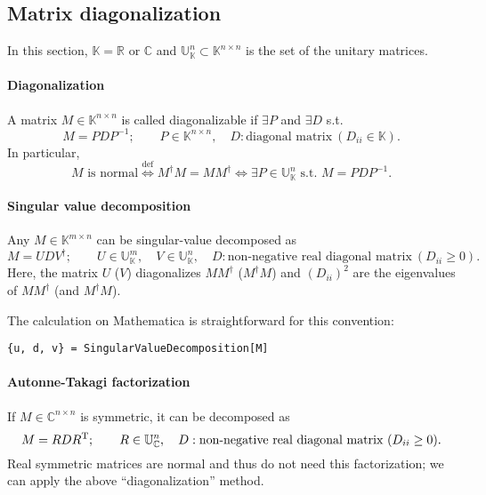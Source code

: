 \documentclass[CheatSheet]{subfiles}
\begin{document}
\subsection{Matrix diagonalization}\label{app:diagonalization}
In this section, $\mathbb K=\mathbb{R}$ or $\mathbb{C}$ and $\mathbb U_{\mathbb K}^{n}\subset \mathbb K^{n\times n}$ is the set of the unitary matrices.

\paragraph{Diagonalization}
A matrix $M\in\mathbb K^{n\times n}$ is called diagonalizable if $\exists P$ and $\exists D$ s.t.
\begin{equation}
 M=PDP^{-1};\qquad
 P\in\mathbb{K}^{n\times n},\quad
 D:\text{diagonal matrix}~(D_{ii}\in\mathbb{K}).
\end{equation}
In particular,
\begin{equation}
 \text{$M$ is normal} \stackrel{\text{def}}\iff M^\dagger M = M M^\dagger \iff
 \exists P\in\mathbb{U}_{\mathbb K}^{n} \text{~s.t.~} M=PDP^{-1}.
\end{equation}


\paragraph{Singular value decomposition}
Any $M\in\mathbb{K}^{m\times n}$ can be singular-value decomposed as
\begin{equation}
 M=UDV^\dagger;\qquad
 U\in\mathbb{U}_{\mathbb K}^m,\quad
 V\in\mathbb{U}_{\mathbb K}^n,\quad
 D: \text{non-negative real diagonal matrix}~(D_{ii}\ge0).
\end{equation}
Here, the matrix $U$ ($V$) diagonalizes $MM^\dagger$ ($M^\dagger M$) and $(D_{ii})^2$ are the eigenvalues of $MM^\dagger$ (and $M^\dagger M$).

The calculation on Mathematica is straightforward for this convention:
\begin{verbatim}
{u, d, v} = SingularValueDecomposition[M]
\end{verbatim}




\paragraph{Autonne-Takagi factorization}
If $M\in\mathbb{C}^{n\times n}$ is symmetric, it can be decomposed as
\begin{equation}
 M=RDR^{\mathrm{T}};\qquad
 R\in\mathbb{U}_{\mathbb C}^n,\quad
 D: \text{non-negative real diagonal matrix}~(D_{ii}\ge0).
\end{equation}
Real symmetric matrices are normal and thus do not need this factorization; we can apply the above ``diagonalization'' method.
\end{document}
